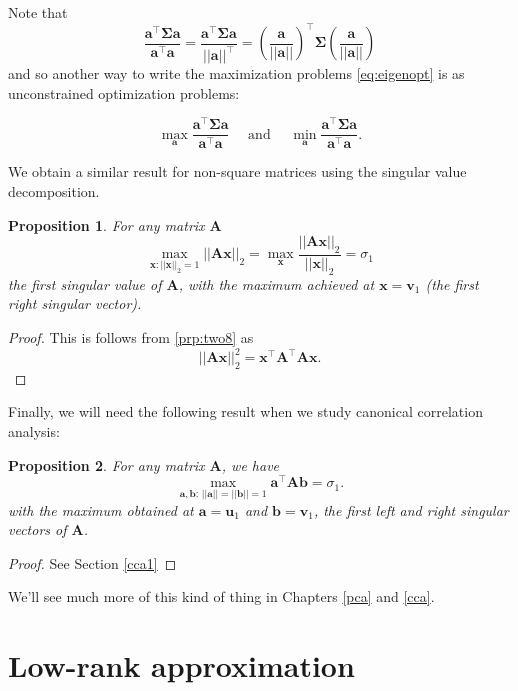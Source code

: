 \documentclass[]{book}
\newtheorem{proposition}{Proposition}[chapter]
\theoremstyle{definition}
\theoremstyle{definition}
\theoremstyle{definition}
\theoremstyle{remark}
\begin{document}
Note that \[\frac{\mathbf a^\top \boldsymbol{\Sigma}\mathbf a}{\mathbf a^\top\mathbf a}=\frac{\mathbf a^\top \boldsymbol{\Sigma}\mathbf a}{||\mathbf a||^\top} = (\frac{\mathbf a}{||\mathbf a||})^\top \boldsymbol{\Sigma}(\frac{\mathbf a}{||\mathbf a||})\]
and so another way to write the maximization problems \eqref{eq:eigenopt} is as unconstrained optimization problems:

\[\max_{\mathbf a}\frac{\mathbf a^\top \boldsymbol{\Sigma}\mathbf a}{\mathbf a^\top\mathbf a}\quad \mbox{ and } \quad \min_{\mathbf a}\frac{\mathbf a^\top \boldsymbol{\Sigma}\mathbf a}{\mathbf a^\top\mathbf a}.\]

We obtain a similar result for non-square matrices using the singular value decomposition.

\begin{proposition}
\protect\hypertarget{prp:svdmax1}{}{\label{prp:svdmax1} }For any matrix \(\mathbf A\)
\[\max_{\mathbf x: ||\mathbf x||_2=1}||\mathbf A\mathbf x||_2=\max_{\mathbf x}\frac{||\mathbf A\mathbf x||_2}{||\mathbf x||_2}=\sigma_1\]
the first singular value of \(\mathbf A\), with the maximum achieved at \(\mathbf x=\mathbf v_1\) (the first right singular vector).
\end{proposition}
\begin{proof}
{}This is follows from \ref{prp:two8} as
\[||\mathbf A\mathbf x||_2^2=\mathbf x^\top \mathbf A^\top\mathbf A\mathbf x.\]
\end{proof}

Finally, we will need the following result when we study canonical correlation analysis:

\begin{proposition}
\protect\hypertarget{prp:svdmax2}{}{\label{prp:svdmax2} }For any matrix \(\mathbf A\), we have
\[
\max_{\mathbf a, \mathbf b:\, \vert \vert \mathbf a\vert \vert=\vert \vert \mathbf b\vert \vert =1} \mathbf a^\top \mathbf A\mathbf b=\sigma_1.
\]
with the maximum obtained at \(\mathbf a=\mathbf u_1\) and \(\mathbf b=\mathbf v_1\), the first left and right singular vectors of \(\mathbf A\).
\end{proposition}

\begin{proof}
{}See Section \ref{cca1}
\end{proof}

We'll see much more of this kind of thing in Chapters \ref{pca} and \ref{cca}.

\hypertarget{low-rank-approximation}{%
\section{Low-rank approximation}\label{low-rank-approximation}}
\end{document}
